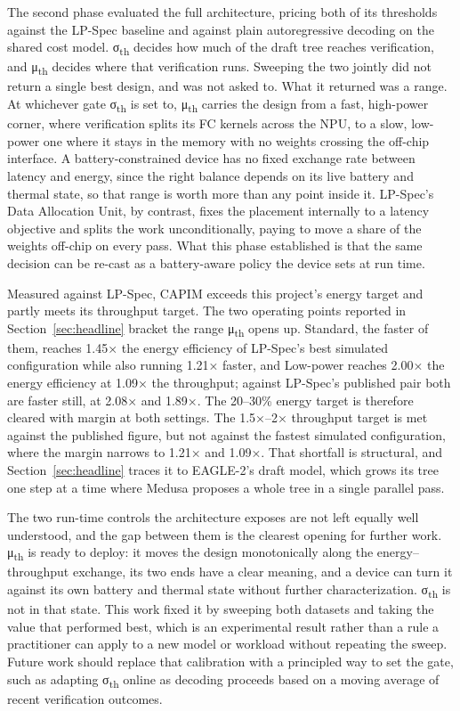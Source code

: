 \documentclass[11pt]{article}
\begin{document}
The second phase evaluated the full architecture, pricing both of its thresholds against the LP-Spec baseline and against plain autoregressive decoding on the shared cost model. σ\textsubscript{th} decides how much of the draft tree reaches verification, and μ\textsubscript{th} decides where that verification runs. Sweeping the two jointly did not return a single best design, and was not asked to. What it returned was a range. At whichever gate σ\textsubscript{th} is set to, μ\textsubscript{th} carries the design from a fast, high-power corner, where verification splits its FC kernels across the NPU, to a slow, low-power one where it stays in the memory with no weights crossing the off-chip interface. A battery-constrained device has no fixed exchange rate between latency and energy, since the right balance depends on its live battery and thermal state, so that range is worth more than any point inside it. LP-Spec's Data Allocation Unit, by contrast, fixes the placement internally to a latency objective and splits the work unconditionally, paying to move a share of the weights off-chip on every pass. What this phase established is that the same decision can be re-cast as a battery-aware policy the device sets at run time.

Measured against LP-Spec, CAPIM exceeds this project's energy target and partly meets its throughput target. The two operating points reported in Section~\ref{sec:headline} bracket the range μ\textsubscript{th} opens up. Standard, the faster of them, reaches 1.45× the energy efficiency of LP-Spec's best simulated configuration while also running 1.21× faster, and Low-power reaches 2.00× the energy efficiency at 1.09× the throughput; against LP-Spec's published pair both are faster still, at 2.08× and 1.89×. The 20--30\% energy target is therefore cleared with margin at both settings. The 1.5×--2× throughput target is met against the published figure, but not against the fastest simulated configuration, where the margin narrows to 1.21× and 1.09×. That shortfall is structural, and Section~\ref{sec:headline} traces it to EAGLE-2's draft model, which grows its tree one step at a time where Medusa proposes a whole tree in a single parallel pass.

The two run-time controls the architecture exposes are not left equally well understood, and the gap between them is the clearest opening for further work. μ\textsubscript{th} is ready to deploy: it moves the design monotonically along the energy--throughput exchange, its two ends have a clear meaning, and a device can turn it against its own battery and thermal state without further characterization. σ\textsubscript{th} is not in that state. This work fixed it by sweeping both datasets and taking the value that performed best, which is an experimental result rather than a rule a practitioner can apply to a new model or workload without repeating the sweep. Future work should replace that calibration with a principled way to set the gate, such as adapting σ\textsubscript{th} online as decoding proceeds based on a moving average of recent verification outcomes.
\end{document}

